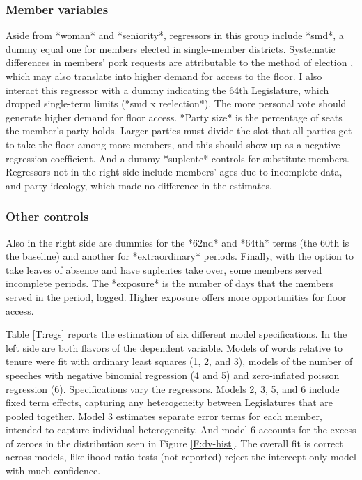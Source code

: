 \documentclass[letter,12pt]{article}
\begin{document}
    \subsubsection{Member variables}

Aside from *woman* and *seniority*, regressors in this group include *smd*, a dummy equal one for members elected in single-member districts. Systematic differences in members' pork requests are attributable to the method of election \citep{kerevelPork2015}, which may also translate into higher demand for access to the floor. I also interact this regressor with a dummy indicating the 64th Legislature, which dropped single-term limits (*smd x reelection*). The more personal vote should generate higher demand for floor access. *Party size* is the percentage of seats the member's party holds. Larger parties must divide the slot that all parties get to take the floor among more members, and this should show up as a negative regression coefficient. And a dummy *suplente* controls for substitute members. Regressors not in the right side include members' ages due to incomplete data, and party ideology, which made no difference in the estimates.

    \subsubsection{Other controls}

Also in the right side are dummies for the *62nd* and *64th* terms (the 60th is the baseline) and another for *extraordinary* periods. Finally, with the option to take leaves of absence and have suplentes take over, some members served incomplete periods. The *exposure* is the number of days that the members served in the period, logged. Higher exposure offers more opportunities for floor access. 


Table \ref{T:regs} reports the estimation of six different model specifications. In the left side are both flavors of the dependent variable. Models of words relative to tenure were fit with ordinary least squares (1, 2, and 3), models of the number of speeches with negative binomial regression (4 and 5) and zero-inflated poisson regression (6). Specifications vary the regressors. Models 2, 3, 5, and 6 include fixed term effects, capturing any heterogeneity between Legislatures that are pooled together. Model 3 estimates separate error terms for each member, intended to capture individual heterogeneity. And model 6 accounts for the excess of zeroes in the distribution seen in Figure \ref{F:dv-hist}. The overall fit is correct across models, likelihood ratio tests (not reported) reject the intercept-only model with much confidence. 
\end{document}
